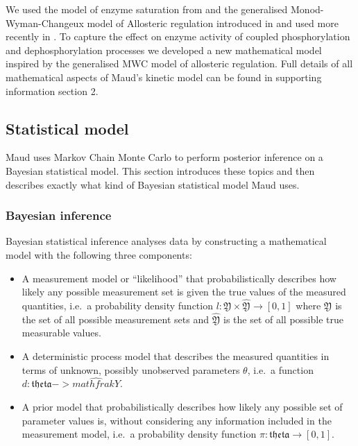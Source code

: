 \documentclass[journal=asbcd6,manuscript=article,layout=traditional]{achemso}
\begin{document}
We used the model of enzyme saturation from
\citet{liebermeister_modular_2010} and the generalised
Monod-Wyman-Changeux model of Allosteric regulation introduced in
\citep{monod_nature_1965, changeux_2013, popova_generalization_1975, popova_description_1979}
and used more recently in \citet{matosGRASPComputationalPlatform2022}.
To capture the effect on enzyme activity of coupled phosphorylation and
dephosphorylation processes we developed a new mathematical model
inspired by the generalised MWC model of allosteric regulation. Full
details of all mathematical aspects of Maud's kinetic model can be found
in supporting information section 2.

\hypertarget{statistical-model}{%
\subsection{Statistical model}\label{statistical-model}}

Maud uses Markov Chain Monte Carlo to perform posterior inference on a
Bayesian statistical model. This section introduces these topics and
then describes exactly what kind of Bayesian statistical model Maud
uses.

\hypertarget{bayesian-inference}{%
\subsubsection{Bayesian inference}\label{bayesian-inference}}

Bayesian statistical inference analyses data by constructing a
mathematical model with the following three components:

\begin{itemize}
\item
  A measurement model or ``likelihood'' that probabilistically describes
  how likely any possible measurement set is given the true values of
  the measured quantities, i.e.~a probability density function
  \(l: \mathfrak{Y}\times\hat{\mathfrak{Y}} \rightarrow [0, 1]\) where
  \(\mathfrak{Y}\) is the set of all possible measurement sets and
  \(\hat{\mathfrak{Y}}\) is the set of all possible true measurable
  values.
\item
  A deterministic process model that describes the measured quantities
  in terms of unknown, possibly unobserved parameters \(\theta\), i.e.~a
  function \(d: \mathfrak{theta} -> \hat{mathfrak{Y}}\).
\item
  A prior model that probabilistically describes how likely any possible
  set of parameter values is, without considering any information
  included in the measurement model, i.e.~a probability density function
  \(\pi : \mathfrak{theta} \rightarrow [0, 1]\).
\end{itemize}
\end{document}
